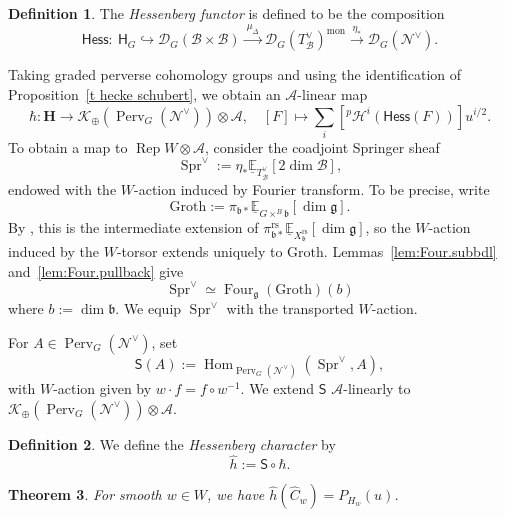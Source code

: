 \documentclass[11pt]{amsart}
\numberwithin{equation}{section}
\newtheorem{theorem}{Theorem}[section]
\theoremstyle{definition}
\newtheorem{definition}[theorem]{Definition}
\newcommand\hecke{\mathbf{H}}  %
\def\lra{\longrightarrow }
\def\beq{\begin{equation}}
\def\eeq{\end{equation}}
\DeclareMathOperator{\Rep}{\mathrm{Rep}}
\DeclareMathOperator{\Perv}{\mathrm{Perv}}
\DeclareMathOperator{\Hom}{Hom}
\DeclareMathOperator{\mon}{mon}
\DeclareMathOperator{\Four}{Four}
\def\cA{\mathcal {A}}
\def\cB{\mathcal {B}}
\def\cH{\mathcal {H}}
\def\EE{\mathbb{E}}
\def\fg{\mathfrak {g}}
\def\fb{\mathfrak {b}}
\DeclareMathOperator{\Spr}{\mathrm{Spr}}
\begin{document}
\begin{definition}\label{def:Hess}
The \emph{Hessenberg functor} is defined to be the composition 
\beq\label{eq:Hess.funct}
	\mathsf{Hess}:~\mathsf H_G\hookrightarrow \mathscr D_G(\cB \times \cB) \xrightarrow{~\mu_{\Delta}~} \mathscr D_{G} (T^\vee_{\cB})^{\mon}  \xrightarrow{~\eta_{*}~} \mathscr D_{G}(\mathcal N^\vee).\eeq

\end{definition}
Taking graded perverse cohomology groups and using the identification of Proposition~\ref{t hecke schubert}, we obtain an $\cA$-linear map
\[
\hbar:\hecke\lra \mathscr K_\oplus(\Perv_G(\mathcal N^\vee))\otimes\cA,
\quad [F]\mapsto\sum_i[{}^p\cH^i(\mathsf{Hess}(F))]u^{i/2}.
\]
To obtain a map to $\Rep W\otimes \cA$, consider the coadjoint Springer sheaf
\[\Spr^\vee:=\eta_*\underline{\EE}_{T^\vee_{\cB}}[2\dim\cB],\]
endowed with the $W$-action induced by Fourier transform. 
To be precise, write
\[
\mathrm{Groth}:=\pi_{\fb*}\underline{\EE}_{G\times^B\fb}[\dim\fg].
\]
By \cite[Theorem~13.5]{jantzen-nilpotent}, this is the intermediate extension of
$\pi_{\fb*}^{\mathrm{rs}}\underline{\EE}_{X_\fb^{\mathrm{rs}}}[\dim\fg]$, so the $W$-action induced by the $W$-torsor extends uniquely to $\mathrm{Groth}$.
Lemmas~\ref{lem:Four.subbdl} and~\ref{lem:Four.pullback} give
\[\Spr^\vee\simeq\Four_\fg(\mathrm{Groth})(b)\]
where $b:=\dim\fb$.
We equip $\Spr^\vee$ with the transported $W$-action.

For $A\in\Perv_G(\mathcal N^\vee)$, set
\[\mathsf S(A):=\Hom_{\Perv_G(\mathcal N^\vee)}(\Spr^\vee,A),\]
with $W$-action given by $w\cdot f=f\circ w^{-1}$.
We extend $\mathsf S$ $\cA$-linearly to $\mathscr K_\oplus(\Perv_G(\mathcal N^\vee))\otimes\cA$.

\begin{definition}
	We define the \emph{Hessenberg character} by
\[\widehat h:=\mathsf S\circ\hbar.\]
\end{definition}


\begin{theorem}\label{thm:smooth} 
For smooth $w\in W$, we have $\widehat h(\widehat C_w)=P_{H_w}(u)$.
\end{theorem}
\end{document}

